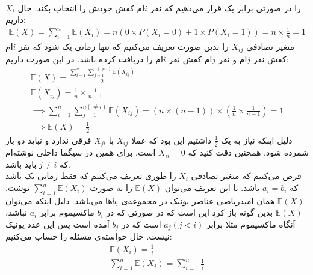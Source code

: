 \\
$X_i$
را در صورتی برابر یک قرار می‌دهیم که نفر
$i$ام
کفش خودش را انتخاب بکند. حال داریم:
\begin{gather*}
    \mathbb{E}(X) = \sum_{i=1}^n \mathbb{E}(X_i) = n (0 \times P(X_i = 0) + 1 \times P(X_i = 1))
    = n \times \frac{1}{n} = 1
\end{gather*}
متغیر تصادفی
$X_{ij}$
را بدین صورت تعریف می‌کنیم که تنها زمانی یک شود که نفر
$i$ام
کفش نفر
$j$ام
و نفر
$j$ام
کفش نفر
$i$ام
را دریافت کرده باشد.
در این صورت داریم:
\begin{gather*}
    \mathbb{E}(X) = \frac{\sum_{i=1}^n \sum_{j=1}^{n (\neq i)} \mathbb{E}(X_{ij})}{2}\\
    \mathbb{E}(X_{ij}) = \frac{1}{n} \times \frac{1}{n-1}\\
    \implies \sum_{i=1}^n \sum_{j=1}^{n (\neq i)} \mathbb{E}(X_{ij}) = (n \times (n - 1)) \times (\frac{1}{n} \times \frac{1}{n-1}) = 1\\
    \implies \mathbb{E}(X) = \frac{1}{2}
\end{gather*}
دلیل اینکه نیاز به یک
$\frac{1}{2}$
داشتیم این بود که عملا
$X_{ij}$ با $X_{ji}$
فرقی ندارد و نباید دو بار شمرده شود. همچنین دقت کنید که
$X_{ii} = 0$
است. برای همین در سیگما داخلی نوشته‌ام که
$j \neq i$
باید باشد.
\\
فرض می‌کنیم که متغیر تصادفی
$X_i$
را طوری تعریف می‌کنیم که فقط زمانی یک باشد که
$a_i = b_i$
باشد. با این تعریف می‌توان
$\mathbb{E}(X)$
را به صورت
$\sum_{i=1}^n \mathbb{E}(X_i)$
نوشت.
$\mathbb{E}(X)$
همان امیدریاضی عناصر یونیک در مجموعه‌ی
$b_i$ها
می‌باشد. دلیل اینکه می‌توان
$\mathbb{E}(X)$
بدین گونه باز کرد این است که در صورتی که در
$b_i$
ماکسیموم برابر
$a_i$
نباشد، آنگاه ماکسیموم مثلا برابر
$a_j (j < i)$
است که در
$b_j$
آمده است پس این عدد یونیک نیست. حال خواسته‌ی مسئله را حساب می‌کنیم:
\begin{gather*}
    \mathbb{E}(X_i) = \frac{1}{i}\\
    \sum_{i=1}^n \mathbb{E}(X_i) = \sum_{i=1}^n \frac{1}{i}
\end{gather*}